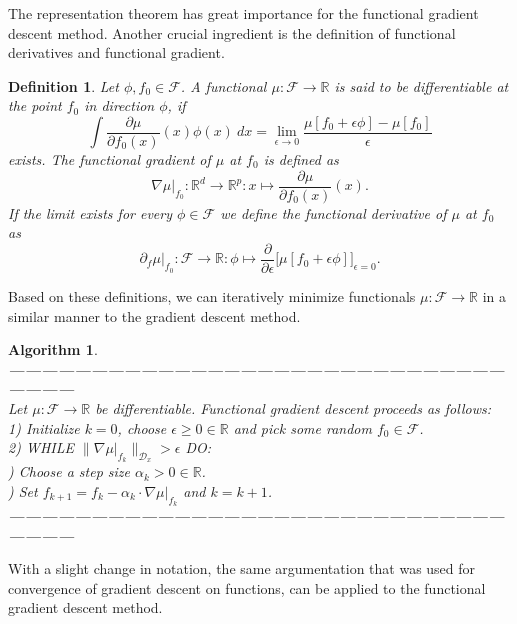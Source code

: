 \documentclass[11pt, a4paper]{article}
\newtheorem{definition}[theorem]{Definition}
\newtheorem{algorithm}[theorem]{Algorithm}
\newcommand{\R}{\mathds{R}}
\newcommand{\D}{\mathcal{D}}
\newcommand{\F}{\mathcal{F}}
\begin{document}
The representation theorem has great importance for the functional gradient descent method. Another crucial ingredient is the definition of functional derivatives and functional gradient.

\begin{definition} \label{def:derivative}
Let $\phi, f_0 \in \F$. A functional $\mu: \F \to \R$ is said to be differentiable at the point $f_0$ in direction $\phi$, if
\[ \int \frac{\partial\mu}{\partial f_0(x)}(x)\phi(x) \ dx = \lim_{\epsilon \to 0} \frac{\mu[f_0 + \epsilon \phi] - \mu[f_0]}{\epsilon} \]
exists. The functional gradient of $\mu$ at $f_0$ is defined as 
\[ \nabla \mu |_{f_0} : \R^d \to \R^p : x \mapsto \frac{\partial \mu}{\partial f_0(x)}(x). \]
 If the limit exists for every $\phi \in \F$ we define the functional derivative of $\mu$ at $f_0$ as
\[ \partial_{f} \mu |_{f_0} : \F \to \R : \phi \mapsto \frac{\partial}{\partial \epsilon} \Big [ \mu[f_0+\epsilon \phi] \Big ]_{\epsilon=0}. \]
\end{definition}

Based on these definitions, we can iteratively minimize functionals $\mu: \F \to \R$ in a similar manner to the gradient descent method.

\begin{algorithm}
\textbf{------------------------------------------------------------------------------------------------------} \\
Let $\mu: \F \to \R$ be differentiable. Functional gradient descent proceeds as follows: \\

1) Initialize $k=0$, choose $\epsilon \geq 0 \in \R$ and pick some random $f_0 \in \F$. \\

2) WHILE $ \big \| \nabla \mu |_{f_k} \big \|_{\D_x} > \epsilon $ DO:\\

) Choose a step size $\alpha_k > 0 \in \R$. \\

) Set $f_{k+1} = f_k - \alpha_k \cdot \nabla \mu |_{f_k}$ and $k = k+1$. \\
\textbf{------------------------------------------------------------------------------------------------------} 
\end {algorithm}

With a slight change in notation, the same argumentation that was used for convergence of gradient descent on functions, can be applied to the functional gradient descent method. \\
\end{document}
